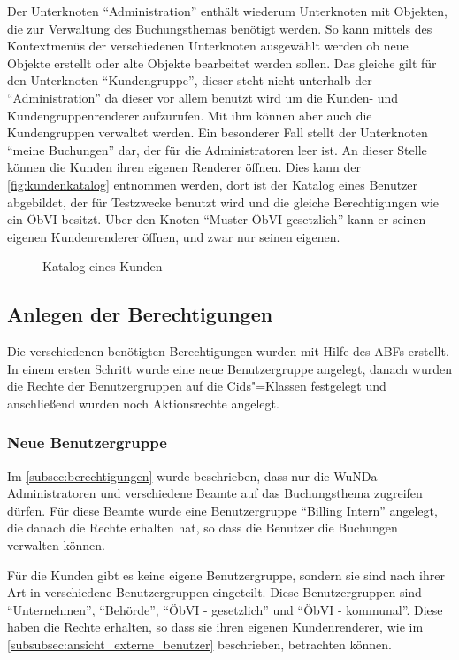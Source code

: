 Der Unterknoten "`Administration"' enthält wiederum Unterknoten mit Objekten, die zur Verwaltung des Buchungsthemas benötigt werden.
So kann mittels des Kontextmenüs der verschiedenen Unterknoten ausgewählt werden ob neue Objekte erstellt oder alte Objekte bearbeitet werden sollen.
Das gleiche gilt für den Unterknoten "`Kundengruppe"', dieser steht nicht unterhalb der "`Administration"' da dieser vor allem benutzt wird um die Kunden- und Kundengruppenrenderer aufzurufen. Mit ihm können aber auch die Kundengruppen verwaltet werden.
Ein besonderer Fall stellt der Unterknoten "`meine Buchungen"' dar, der für die Administratoren leer ist.
An dieser Stelle können die Kunden ihren eigenen Renderer öffnen.
Dies kann der \autoref{fig:kundenkatalog} entnommen werden, dort ist der Katalog eines Benutzer abgebildet, der für Testzwecke benutzt wird und die gleiche Berechtigungen wie ein \ac{ÖbVI} besitzt. Über den Knoten \enquote{Muster ÖbVI gesetzlich} kann er seinen eigenen Kundenrenderer öffnen, und zwar nur seinen eigenen.
\begin{figure}[htb]
  \centering
  \caption{Katalog eines Kunden} \label{fig:kundenkatalog} 
\end{figure}
 

\subsection{Anlegen der Berechtigungen}

Die verschiedenen benötigten Berechtigungen wurden mit Hilfe des \ac{ABF}s erstellt.
In einem ersten Schritt wurde eine neue Benutzergruppe angelegt, danach wurden die Rechte der Benutzergruppen auf die Cids"=Klassen festgelegt und anschließend wurden noch Aktionsrechte angelegt. 

\subsubsection{Neue Benutzergruppe}
Im \autoref{subsec:berechtigungen} wurde beschrieben, dass nur die \ac{WuNDa}-Administratoren und verschiedene Beamte auf das Buchungsthema zugreifen dürfen.
Für diese Beamte wurde eine Benutzergruppe "`Billing Intern"' angelegt, die danach die Rechte erhalten hat, so dass die Benutzer die Buchungen verwalten können.

Für die Kunden gibt es keine eigene Benutzergruppe, sondern sie sind nach ihrer Art in verschiedene Benutzergruppen eingeteilt.
Diese Benutzergruppen sind "`Unternehmen"', "`Behörde"', "`ÖbVI - gesetzlich"' und "`ÖbVI - kommunal"'.
Diese haben die Rechte erhalten, so dass sie ihren eigenen Kundenrenderer, wie im \autoref{subsubsec:ansicht_externe_benutzer} beschrieben, betrachten können.

